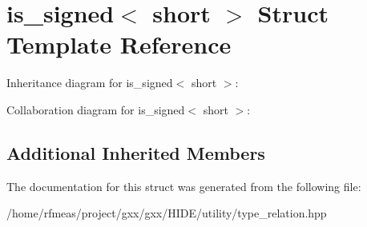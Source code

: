 \hypertarget{structis__signed_3_01short_01_4}{}\section{is\+\_\+signed$<$ short $>$ Struct Template Reference}
\label{structis__signed_3_01short_01_4}


Inheritance diagram for is\+\_\+signed$<$ short $>$\+:


Collaboration diagram for is\+\_\+signed$<$ short $>$\+:
\subsection*{Additional Inherited Members}


The documentation for this struct was generated from the following file\+:\begin{DoxyCompactItemize}
\item 
/home/rfmeas/project/gxx/gxx/\+H\+I\+D\+E/utility/type\+\_\+relation.\+hpp\end{DoxyCompactItemize}
